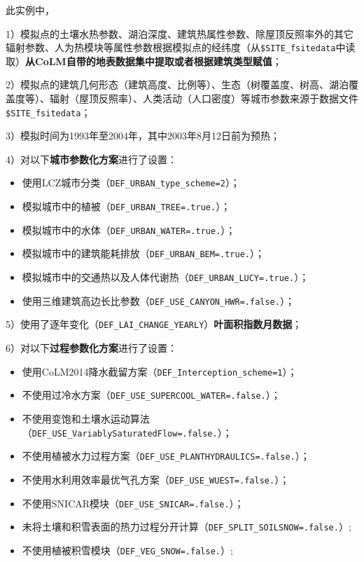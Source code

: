 此实例中，\par
1）模拟点的土壤水热参数、湖泊深度、建筑热属性参数、除屋顶反照率外的其它辐射参数、人为热模块等属性参数根据模拟点的经纬度（从\texttt{\$SITE\_fsitedata}中读取）\textbf{从CoLM自带的地表数据集中提取或者根据建筑类型赋值}；\par
2）模拟点的建筑几何形态（建筑高度、比例等）、生态（树覆盖度、树高、湖泊覆盖度等）、辐射（屋顶反照率）、人类活动（人口密度）等城市参数来源于数据文件\texttt{\$SITE\_fsitedata}；\par
3）模拟时间为1993年至2004年，其中2003年8月12日前为预热；\par
4）对以下\textbf{城市参数化方案}进行了设置：
\begin{itemize}[nosep,leftmargin=4em]
    \item 使用LCZ城市分类（\texttt{DEF\_URBAN\_type\_scheme=2}）；
    \item 模拟城市中的植被（\texttt{DEF\_URBAN\_TREE=.true.}）；
    \item 模拟城市中的水体（\texttt{DEF\_URBAN\_WATER=.true.}）；
    \item 模拟城市中的建筑能耗排放（\texttt{DEF\_URBAN\_BEM=.true.}）；
    \item 模拟城市中的交通热以及人体代谢热（\texttt{DEF\_URBAN\_LUCY=.true.}）；
    \item 使用三维建筑高边长比参数（\texttt{DEF\_USE\_CANYON\_HWR=.false.}）；
\end{itemize} \par
5）使用了逐年变化（\texttt{DEF\_LAI\_CHANGE\_YEARLY}）\textbf{叶面积指数月数据}；\par
6）对以下\textbf{过程参数化方案}进行了设置：
\begin{itemize}[nosep,leftmargin=4em]
    \item 使用CoLM2014降水截留方案（\texttt{DEF\_Interception\_scheme=1}）；
    \item 不使用过冷水方案（\texttt{DEF\_USE\_SUPERCOOL\_WATER=.false.}）；
    \item 不使用变饱和土壤水运动算法（\texttt{DEF\_USE\_VariablySaturatedFlow=.false.}）；
    \item 不使用植被水力过程方案（\texttt{DEF\_USE\_PLANTHYDRAULICS=.false.}）；
    \item 不使用水利用效率最优气孔方案（\texttt{DEF\_USE\_WUEST=.false.}）；
    \item 不使用SNICAR模块（\texttt{DEF\_USE\_SNICAR=.false.}）；
    \item 未将土壤和积雪表面的热力过程分开计算（\texttt{DEF\_SPLIT\_SOILSNOW=.false.}）;
    \item 不使用植被积雪模块（\texttt{DEF\_VEG\_SNOW=.false.}）;
\end{itemize}
